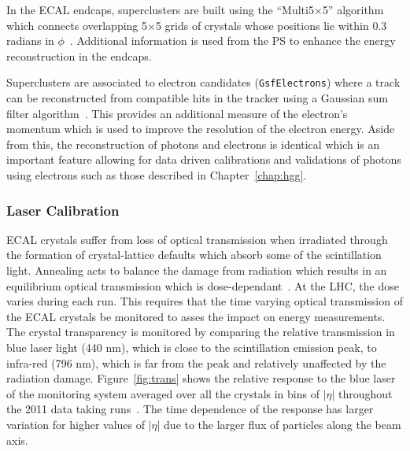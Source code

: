 In the ECAL endcaps, superclusters are built using the ``Multi5$\times$5'' algorithm which 
connects overlapping 5$\times$5 grids of crystals whose positions lie within 
0.3 radians in $\phi$~\citep{AN-09-164}. 
Additional information is used from the PS to enhance the energy reconstruction in the endcaps. 

Superclusters are associated to electron candidates (\texttt{GsfElectrons}) 
where a track can be reconstructed from
compatible hits in the tracker using a Gaussian sum filter algorithm~\citep{GSF_Electron_Reconstruction_CMS}.  
This provides an additional measure of the electron's momentum which is used 
to improve the resolution of the electron energy.
Aside from this, the reconstruction of photons and electrons is identical which is an 
important feature allowing for data driven calibrations and validations of photons using 
electrons such as those described in Chapter~\ref{chap:hgg}.


\subsubsection{Laser Calibration}

ECAL crystals suffer from loss of optical transmission when irradiated through 
the formation of crystal-lattice defaults which absorb some of the scintillation light. Annealing
acts to balance the damage from radiation which results in an equilibrium optical 
transmission which is dose-dependant~\citep{TDR1}. 
At the LHC, the dose varies during each run. This requires that the time varying optical transmission of the ECAL 
crystals be monitored to asses the impact on energy measurements.
The crystal transparency is monitored by comparing the relative transmission in blue laser light (440 nm), 
which is close to the scintillation emission peak, to infra-red (796 nm), which is far from the 
peak and relatively unaffected by the radiation damage.
Figure~\ref{fig:trans} shows the relative response to the blue laser of the monitoring system
averaged over all the crystals in bins of $|\eta|$ throughout the 2011 data taking 
runs~\citep{CMS-DP-2012-007}. 
The time dependence of the response has larger variation for higher values of $|\eta|$ due to the larger flux
of particles along the beam axis.


